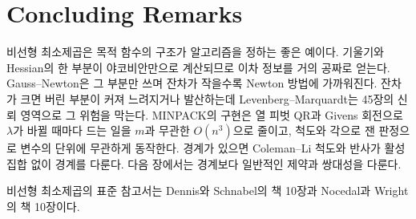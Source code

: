 \section{Concluding Remarks}

비선형 최소제곱은 목적 함수의 구조가 알고리즘을 정하는 좋은 예이다. 기울기와 Hessian의 한 부분이 야코비안만으로 계산되므로 이차 정보를 거의 공짜로 얻는다. Gauss--Newton은 그 부분만 쓰며 잔차가 작을수록 Newton 방법에 가까워진다. 잔차가 크면 버린 부분이 커져 느려지거나 발산하는데 Levenberg--Marquardt는 45장의 신뢰 영역으로 그 위험을 막는다. MINPACK의 구현은 열 피벗 QR과 Givens 회전으로 $\lambda$가 바뀔 때마다 드는 일을 $m$과 무관한 $O(n^3)$으로 줄이고, 척도와 각으로 잰 판정으로 변수의 단위에 무관하게 동작한다. 경계가 있으면 Coleman--Li 척도와 반사가 활성 집합 없이 경계를 다룬다. 다음 장에서는 경계보다 일반적인 제약과 쌍대성을 다룬다.

비선형 최소제곱의 표준 참고서는 Dennis와 Schnabel의 책\cite{dennis1996} 10장과 Nocedal과 Wright의 책\cite{nocedal2006} 10장이다.

\chapterreferences
